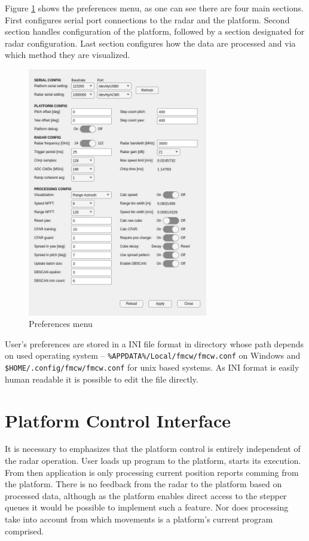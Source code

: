 Figure \ref{fig:preferences} shows the preferences menu, as one can see there are four main sections.
First configures serial port connections to the radar and the platform.
Second section handles configuration of the platform, followed by a section designated for radar configuration.
Last section configures how the data are processed and via which method they are visualized.

\begin{figure}[h!]
  \centering
  \includegraphics[width=0.7\textwidth]{../img/preferences.jpg}
  \caption[Preferences menu]{Preferences menu}
  \label{fig:preferences}
\end{figure}

User's preferences are stored in a INI file format in directory whose path depends on used operating system -- \texttt{\%APPDATA\%/Local/fmcw/fmcw.conf} on Windows and \texttt{\$HOME/.config/fmcw/fmcw.conf} for unix based systems.
As INI format is easily human readable it is possible to edit the file directly.


\section{Platform Control Interface}

It is necessary to emphasizes that the platform control is entirely independent of the radar operation.
User loads up program to the platform, starts its execution.
From then application is only processing current position reports comming from the platform.
There is no feedback from the radar to the platform based on processed data, although as the platform enables direct access to the stepper queues it would be possible to implement such a feature.
Nor does processing take into account from which movements is a platform's current program comprised.

